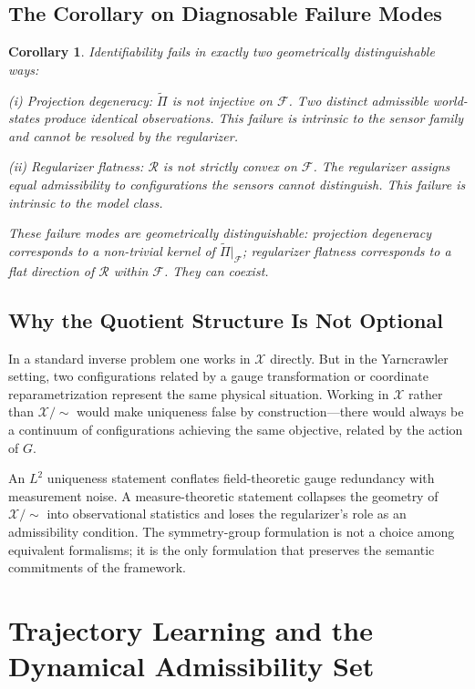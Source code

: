 \documentclass[12pt, oneside]{article}
\newtheorem{corollary}[theorem]{Corollary}
\newcommand{\Xmod}{\mathcal{X}/{\sim}}
\newcommand{\Ftil}{\widetilde{\Pi}}
\begin{document}
\subsection{The Corollary on Diagnosable Failure Modes}

\begin{corollary}
\label{cor:failures}
Identifiability fails in exactly two geometrically distinguishable ways:

\emph{(i) Projection degeneracy}: $\Ftil$ is not injective on $\mathcal{F}$. Two distinct
admissible world-states produce identical observations. This failure is intrinsic to the
sensor family and cannot be resolved by the regularizer.

\emph{(ii) Regularizer flatness}: $\mathcal{R}$ is not strictly convex on $\mathcal{F}$.
The regularizer assigns equal admissibility to configurations the sensors cannot
distinguish. This failure is intrinsic to the model class.

These failure modes are geometrically distinguishable: projection degeneracy corresponds
to a non-trivial kernel of $\Ftil|_{\mathcal{F}}$; regularizer flatness corresponds to a
flat direction of $\mathcal{R}$ within $\mathcal{F}$. They can coexist.
\end{corollary}

\subsection{Why the Quotient Structure Is Not Optional}

In a standard inverse problem one works in $\mathcal{X}$ directly. But in the Yarncrawler
setting, two configurations related by a gauge transformation or coordinate
reparametrization represent the same physical situation. Working in $\mathcal{X}$ rather
than $\Xmod$ would make uniqueness false by construction---there would always be a
continuum of configurations achieving the same objective, related by the action of $G$.

An $L^2$ uniqueness statement conflates field-theoretic gauge redundancy with measurement
noise. A measure-theoretic statement collapses the geometry of $\Xmod$ into observational
statistics and loses the regularizer's role as an admissibility condition. The
symmetry-group formulation is not a choice among equivalent formalisms; it is the only
formulation that preserves the semantic commitments of the framework.

\section{Trajectory Learning and the Dynamical Admissibility Set}
\label{sec:disambiguation}
\end{document}
